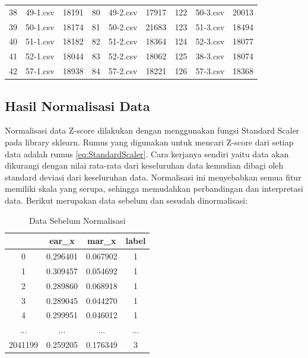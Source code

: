 \begin{longtable}{|c|c|c|c|c|c|c|c|c|}
  38          & 49-1.csv       & 18191         & 80          & 49-2.csv       & 17917         & 122         & 50-3.csv       & 20013         \\
  39          & 50-1.csv       & 18174         & 81          & 50-2.csv       & 21683         & 123         & 51-3.csv       & 18494         \\
  40          & 51-1.csv       & 18182         & 82          & 51-2.csv       & 18364         & 124         & 52-3.csv       & 18077         \\
  41          & 52-1.csv       & 18044         & 83          & 52-2.csv       & 18062         & 125         & 38-3.csv       & 18074         \\
  42          & 57-1.csv       & 18938         & 84          & 57-2.csv       & 18221         & 126         & 57-3.csv       & 18368         \\
  \hline
\end{longtable}

\subsection{Hasil Normalisasi Data}
Normalisasi data Z-score dilakukan dengan menggunakan fungsi Standard Scaler pada library sklearn. Rumus yang digunakan untuk mencari
Z-score dari setiap data adalah rumus \ref{eq:StandardScaler}. Cara kerjanya sendiri yaitu data akan dikurangi dengan nilai rata-rata
dari keseluruhan data kemudian dibagi oleh standard deviasi dari keseluruhan data. Normalisasi ini menyebabkan semua fitur
memiliki skala yang serupa, sehingga memudahkan perbandingan dan interpretasi data. Berikut merupakan data sebelum dan sesudah
dinormalisasi:

\begin{longtable}{|c|c|c|c|}
  \caption{Data Sebelum Normalisasi}
  \label{tb:NaNdata}                                             \\
  \hline
  \rowcolor[HTML]{C0C0C0}
  \textbf{} & \textbf{ear\_x} & \textbf{mar\_x} & \textbf{label} \\
  \hline
  0         & 0.296401        & 0.067902        & 1              \\
  1         & 0.309457        & 0.054692        & 1              \\
  2         & 0.289860        & 0.068918        & 1              \\
  3         & 0.289045        & 0.044270        & 1              \\
  4         & 0.299951        & 0.046012        & 1              \\
  ...       & ...             & ...             & ...            \\
  2041199   & 0.259205        & 0.176349        & 3              \\
  \hline
\end{longtable}


